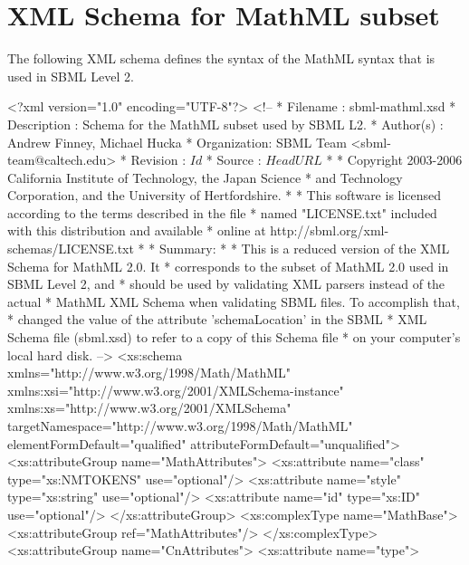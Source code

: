 
\section{XML Schema for MathML subset}
\label{apdx:mathml-subset-schema}

The following XML schema defines the syntax of the MathML syntax
that is used in SBML Level 2.

\begin{example}\begin{footnotesize}
<?xml version="1.0" encoding="UTF-8"?>
<!--
 * Filename    : sbml-mathml.xsd
 * Description : Schema for the MathML subset used by SBML L2.
 * Author(s)   : Andrew Finney, Michael Hucka
 * Organization: SBML Team <sbml-team@caltech.edu>
 * Revision    : $Id$
 * Source      : $HeadURL$
 *
 * Copyright 2003-2006 California Institute of Technology, the Japan Science
 * and Technology Corporation, and the University of Hertfordshire.
 *
 * This software is licensed according to the terms described in the file
 * named "LICENSE.txt" included with this distribution and available
 * online at http://sbml.org/xml-schemas/LICENSE.txt
 *
 * Summary:
 * 
 * This is a reduced version of the XML Schema for MathML 2.0.  It 
 * corresponds to the subset of MathML 2.0 used in SBML Level 2, and
 * should be used by validating XML parsers instead of the actual
 * MathML XML Schema when validating SBML files.  To accomplish that,
 * changed the value of the attribute 'schemaLocation' in the SBML
 * XML Schema file (sbml.xsd) to refer to a copy of this Schema file
 * on your computer's local hard disk.
-->
<xs:schema xmlns="http://www.w3.org/1998/Math/MathML" 
           xmlns:xsi="http://www.w3.org/2001/XMLSchema-instance" 
           xmlns:xs="http://www.w3.org/2001/XMLSchema" 
           targetNamespace="http://www.w3.org/1998/Math/MathML" 
           elementFormDefault="qualified" 
           attributeFormDefault="unqualified">
    <xs:attributeGroup name="MathAttributes">
        <xs:attribute name="class" type="xs:NMTOKENS" use="optional"/>
        <xs:attribute name="style" type="xs:string" use="optional"/>
        <xs:attribute name="id" type="xs:ID" use="optional"/>
    </xs:attributeGroup>
    <xs:complexType name="MathBase">
        <xs:attributeGroup ref="MathAttributes"/>
    </xs:complexType>
    <xs:attributeGroup name="CnAttributes">
        <xs:attribute name="type">

\end{footnotesize}
\end{example}
